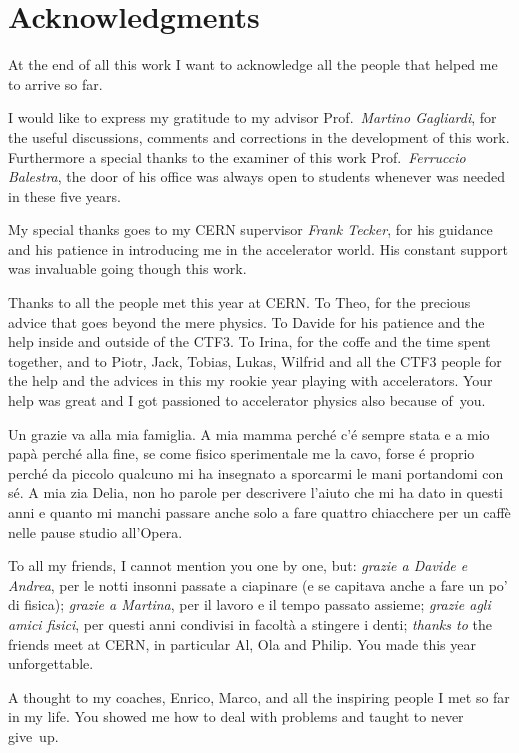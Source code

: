 \chapter*{Acknowledgments}

At the end of all this work I want to acknowledge all the people that helped me to arrive so far.

I would like to express my gratitude to my advisor Prof.~\textit{Martino Gagliardi}, for the useful discussions, comments and corrections in the development of this work. Furthermore a special thanks to the examiner of this work Prof.~\textit{Ferruccio Balestra}, the door of his office was always open to students whenever was needed in these five years. 

My special thanks goes to my CERN supervisor \textit{Frank Tecker}, for his guidance and his patience in introducing me in the accelerator world. His constant support was invaluable going though this work.

Thanks to all the people met this year at CERN. To Theo, for the precious advice that goes beyond the mere physics. To Davide for his patience and the help inside and outside of the CTF3. To Irina, for the coffe and the time spent together,  and to Piotr, Jack, Tobias, Lukas, Wilfrid and all the CTF3 people for the help and the advices in this my rookie year playing with accelerators. Your help was great and I got passioned to accelerator physics also because of~you.

Un grazie va alla mia famiglia.  A mia mamma perché c'é sempre stata e a mio pap\`a perché alla fine, se come fisico sperimentale me la cavo, forse é proprio perché da piccolo qualcuno mi ha insegnato a sporcarmi le mani portandomi con sé. A mia zia Delia, non ho parole per descrivere l'aiuto che mi ha dato in questi anni e quanto mi manchi passare anche solo a fare quattro chiacchere per un caff\`e nelle pause studio all'Opera.

To all my friends, I cannot mention you one by one, but: \textit{grazie a Davide e Andrea}, per le notti insonni passate a ciapinare (e se capitava anche a fare un po' di fisica); \textit{grazie a Martina}, per il lavoro e il tempo passato assieme; \textit{grazie agli amici fisici}, per questi anni condivisi in facolt\`a a stingere i denti; \textit{thanks to} the friends meet at CERN, in particular Al, Ola and Philip. You made this year unforgettable.

A thought to my coaches, Enrico, Marco, and all the inspiring people I met so far in my life. You showed me how to deal with problems and taught to never give~up.

